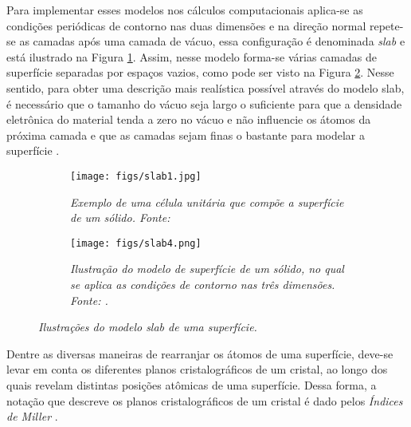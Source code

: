 Para implementar esses modelos nos cálculos computacionais aplica-se as condições periódicas de contorno nas duas dimensões e na direção normal repete-se as camadas após uma camada de vácuo, essa configuração é denominada \textit{slab} e está ilustrado na Figura \ref{fig:slab1}. Assim, nesse modelo forma-se várias camadas de superfície separadas por espaços vazios, como pode ser visto na Figura \ref{fig:slab2}. Nesse sentido, para obter uma descrição mais realística possível através do modelo slab, é necessário que o tamanho do vácuo seja largo o suficiente para que a densidade eletrônica do material tenda a zero no vácuo e não influencie os átomos da próxima camada e que as camadas sejam finas o bastante para modelar a superfície \cite{density-book}.



\begin{figure}
	\centering
	\begin{subfigure}[b]{0.4\textwidth}            
		\texttt{[image: figs/slab1.jpg]}
		\caption{\textit{Exemplo de uma célula unitária que compõe a superfície de um sólido. Fonte: \citeauthor{density-book}}}
		\label{fig:slab1}
	\end{subfigure}\;\;
	\begin{subfigure}[b]{0.4\textwidth}
		\centering
		\texttt{[image: figs/slab4.png]}
		\caption{\textit{Ilustração do modelo de superfície de um sólido, no qual se aplica as condições de contorno nas três dimensões. Fonte: \citeauthor{surface-book}.}}
		\label{fig:slab2}
	\end{subfigure}
	\caption{\textit{Ilustrações do modelo slab de uma superfície.}}\label{fig:slab}
\end{figure} 

Dentre as diversas maneiras de rearranjar os átomos de uma superfície, deve-se levar em conta os diferentes planos cristalográficos de um cristal, ao longo dos quais revelam distintas posições atômicas de uma superfície. Dessa forma, a notação que descreve os planos cristalográficos de um cristal é dado pelos \textit{Índices de Miller} \cite{density-book}. 

